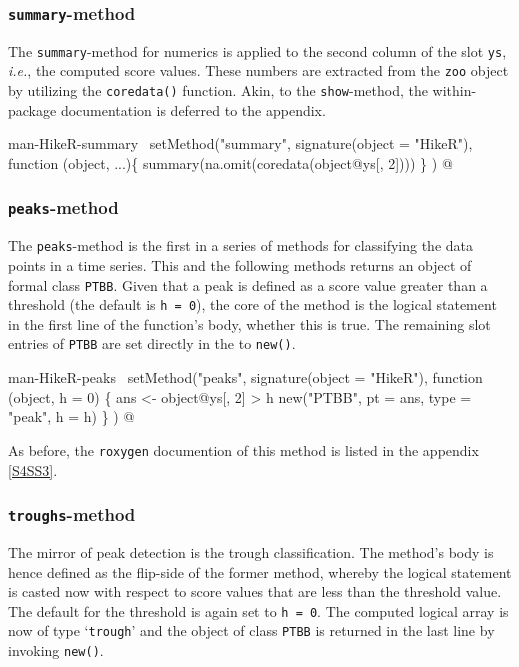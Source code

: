 \documentclass[a4paper]{article}
\begin{document}
\subsubsection{\texttt{summary}-method}
The \verb?summary?-method for numerics is applied to the second column of the
slot \verb?ys?, \emph{i.e.}, the computed score values. These numbers are
extracted from the \verb?zoo? object by utilizing the \verb?coredata()?
function. Akin, to the \verb?show?-method, the within-package documentation
is deferred to the appendix.

\nwenddocs{}\endmoddef
\LA{}man-HikeR-summary~{\nwtagstyle{}}\RA{}
setMethod("summary",
          signature(object = "HikeR"),
          function (object, ...)\{
              summary(na.omit(coredata(object@ys[, 2])))
          \}
)
\nwendcode{}@

\subsubsection{\texttt{peaks}-method}
The \verb?peaks?-method is the first in a series of methods for
classifying the data points in a time series. This and the following
methods returns an object of formal class \verb?PTBB?. Given that a peak
is defined as a score value greater than a threshold (the default is
\verb?h = 0?), the core of the method is the logical statement in the
first line of the function's body, whether this is true. The remaining
slot entries of \verb?PTBB? are set directly in the to \verb?new()?.

\nwenddocs{}\endmoddef
\LA{}man-HikeR-peaks~{\nwtagstyle{}}\RA{}
setMethod("peaks",
    signature(object = "HikeR"),
    function (object, h = 0) \{
        ans <- object@ys[, 2] > h
        new("PTBB", pt = ans, type = "peak", h = h)
    \}
)
\nwendcode{}@

As before, the \verb?roxygen? documention of this method is listed in the
appendix \ref{S4SS3}.

\subsubsection{\texttt{troughs}-method}
The mirror of peak detection is the trough classification. The
method's body is hence defined as the flip-side of the former method,
whereby the logical statement is casted now with respect to score
values that are less than the threshold value. The default for the
threshold is again set to \verb?h = 0?. The computed logical array is now
of type `\verb?trough?' and the object of class \verb?PTBB? is returned in
the last line by invoking \verb?new()?.
\end{document}

